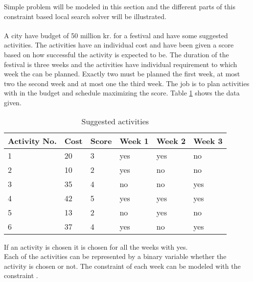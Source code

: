 Simple problem will be modeled in this section and the different parts of this constraint based local search solver 
will be illustrated. \\
 \\ 
A city have budget of 50 million kr. for a festival and have some suggested activities. The activities have 
an individual cost and have been given a score based on how successful the activity is expected to be. The duration of 
the festival is three weeks and the activities have individual requirement to which week the can be planned. Exactly 
two must be planned the first week, at most two the second week and at most one the third week. The job is to 
plan activities with in the budget and schedule maximizing the score. Table \ref{tab_activity} shows the data given. \\
\begin{table}[b]
\centering
\begin{tabular}{|l|l|l|l|l|l|}
\hline
Activity No. & Cost & Score & Week 1 & Week 2 & Week 3 \\ \hline
1            & 20   & 3     & yes    & yes    & no     \\ \hline
2            & 10   & 2     & yes    & no     & no     \\ \hline
3            & 35   & 4     & no     & no     & yes    \\ \hline
4            & 42   & 5     & yes    & yes    & yes    \\ \hline
5            & 13   & 2     & no     & yes    & no     \\ \hline
6            & 37   & 4     & yes    & no     & yes    \\ \hline
\end{tabular}
\caption{Suggested activities}
\label{tab_activity}
\end{table}
If an activity is chosen it is chosen for all the weeks with yes. \\ 
Each of the activities can be represented by a binary variable whether the activity is chosen or not. The constraint of 
each week can be modeled with the  constraint . 